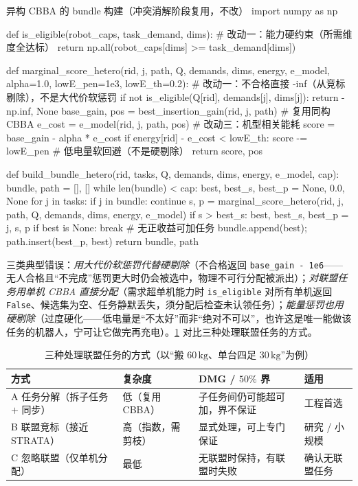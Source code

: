 \begin{codebox}[Python]{异构 CBBA 的 bundle 构建（冲突消解阶段复用，不改）}
import numpy as np

def is_eligible(robot_caps, task_demand, dims):      # 改动一：能力硬约束（所需维度全达标）
    return np.all(robot_caps[dims] >= task_demand[dims])

def marginal_score_hetero(rid, j, path, Q, demands, dims, energy, e_model,
                          alpha=1.0, lowE_pen=1e3, lowE_th=0.2):
    # 改动一：不合格直接 -inf（从竞标剔除），不是大代价软惩罚
    if not is_eligible(Q[rid], demands[j], dims[j]):
        return -np.inf, None
    base_gain, pos = best_insertion_gain(rid, j, path)     # 复用同构 CBBA
    e_cost = e_model(rid, j, path, pos)                    # 改动三：机型相关能耗
    score = base_gain - alpha * e_cost
    if energy[rid] - e_cost < lowE_th:
        score -= lowE_pen                                 # 低电量软回避（不是硬剔除）
    return score, pos

def build_bundle_hetero(rid, tasks, Q, demands, dims, energy, e_model, cap):
    bundle, path = [], []
    while len(bundle) < cap:
        best, best_s, best_p = None, 0.0, None
        for j in tasks:
            if j in bundle: continue
            s, p = marginal_score_hetero(rid, j, path, Q, demands, dims, energy, e_model)
            if s > best_s: best, best_s, best_p = j, s, p
        if best is None: break                            # 无正收益可加任务
        bundle.append(best); path.insert(best_p, best)
    return bundle, path
\end{codebox}

\noindent 三类典型错误：\emph{用大代价软惩罚代替硬剔除}（不合格返回 \texttt{base\_gain - 1e6}——无人合格且“不完成”惩罚更大时仍会被选中，物理不可行分配被派出）；\emph{对联盟任务用单机 CBBA 直接分配}（需求超单机能力时 \texttt{is\_eligible} 对所有单机返回 \texttt{False}、候选集为空、任务静默丢失，须分配后检查未认领任务）；\emph{能量惩罚也用硬剔除}（过度硬化——低电量是“不太好”而非“绝对不可以”，也许这是唯一能做该任务的机器人，宁可让它做完再充电）。\cref{tab:hmr-coalition-methods} 对比三种处理联盟任务的方式。

\begin{table}[H]\centering\small
\caption{三种处理联盟任务的方式（以“搬 $60\,\mathrm{kg}$、单台四足 $30\,\mathrm{kg}$”为例）}
\label{tab:hmr-coalition-methods}
\begin{tabular}{llll}
\toprule
方式 & 复杂度 & DMG / $50\%$ 界 & 适用 \\
\midrule
A 任务分解（拆子任务 $+$ 同步） & 低（复用 CBBA） & 子任务间仍可能超可加，界不保证 & 工程首选 \\
B 联盟竞标（接近 STRATA） & 高（指数，需剪枝） & 显式处理，可上专门保证 & 研究 / 小规模 \\
C 忽略联盟（仅单机分配） & 最低 & 无联盟时保持，有联盟时失败 & 确认无联盟任务 \\
\bottomrule
\end{tabular}
\end{table}

